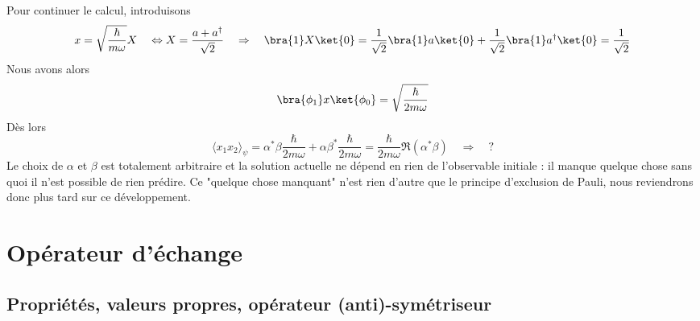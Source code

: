 Pour continuer le calcul, introduisons
\begin{equation}
x = \sqrt{\frac{\hbar}{m\omega}}X\quad\Leftrightarrow X = \frac{a+a^\dagger}{\sqrt{2}}\quad \Rightarrow \quad \bra{1}X\ket{0} =
\frac{1}{\sqrt{2}}\bra{1}a\ket{0} + \frac{1}{\sqrt{2}}\bra{1}a^\dagger\ket{0} = \frac{1}{\sqrt{2}}
\end{equation}
Nous avons alors
\begin{equation}
\bra{\phi_1}x\ket{\phi_0} = \sqrt{\dfrac{\hbar}{2m\omega}}
\end{equation}
Dès lors
\begin{equation}
\langle x_1x_2\rangle_\psi = \alpha^*\beta \frac{\hbar}{2m\omega}+ \alpha\beta^*\frac{\hbar}{2m\omega} = \frac{\hbar}{
2m\omega}\Re(\alpha^*\beta) \quad\Rightarrow\quad ?
\end{equation}
Le choix de $\alpha$ et $\beta$ est totalement arbitraire et la solution actuelle ne dépend en rien de l'observable 
initiale : il manque quelque chose sans quoi il n'est possible de rien prédire. Ce "quelque chose manquant" n'est rien 
d'autre que le principe d'exclusion de Pauli, nous reviendrons donc plus tard sur ce développement.

\section{Opérateur d'échange}
\subsection{Propriétés, valeurs propres, opérateur (anti)-symétriseur}
